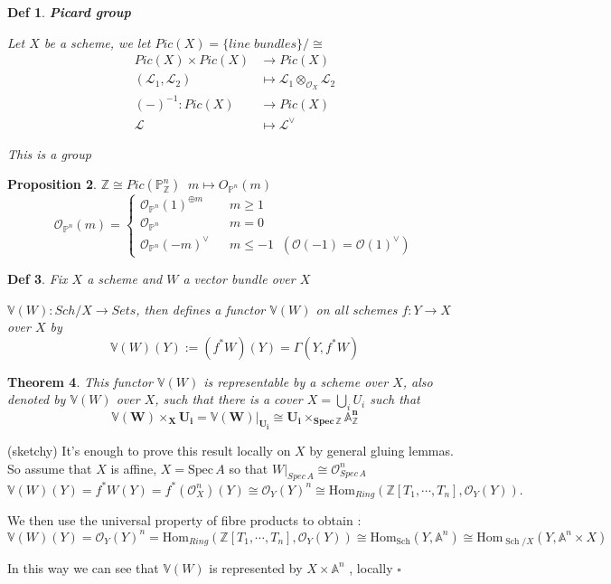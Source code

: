 \documentclass{article}
\newtheorem{theorem}{Theorem}[section]
\newtheorem{definition}[theorem]{Def}
\newtheorem{proposition}[theorem]{Proposition}
\newenvironment{Proof}{{\noindent \indent \it Proof:\quad}}{\hfill $\square$\par}
\begin{document}
\begin{definition}
    \textbf{Picard group}

    Let $X$ be a scheme, we let $Pic(X)=\{line\;bundles\}/\cong$
\begin{align*}
\label{sup}
Pic(X)\times Pic(X)&\to Pic(X)\\
(\mathcal L_1,\mathcal L_2)&\mapsto \mathcal L_1\otimes_{\mathcal O_X}\mathcal L_2\\
(-)^{-1}:Pic(X)&\to Pic(X)\\
\mathcal L&\mapsto \mathcal L^\vee
\end{align*}    

    This is a group
\end{definition}

\begin{proposition}
    $\mathbb Z\cong Pic(\mathbb P_{\mathbb Z}^n) \;\; m \mapsto O_{\mathbb P^n}(m)$
$$ 
\mathcal O_{\mathbb P^n}(m)=\left\{
\begin{array}{rcl}
\mathcal O_{\mathbb P^n}(1)^{\oplus m}       &      & m\geq 1\\
\mathcal O_{\mathbb P^n}     &      &  m=0\\
\mathcal O_{\mathbb P^n}(-m)^{\vee}  &  & m\leq -1\;\;(\mathcal O(-1)=\mathcal O(1)^\vee)
\end{array} \right.
$$
\end{proposition}

\begin{definition}
    Fix $X$ a scheme and $W$ a vector bundle over $X$

    $\mathbb V(W):Sch/X\to Sets$, then  defines a functor $\mathbb{V}(W)$ on all schemes $f:Y\to X$ over $X$ by
$$
\mathbb V(W)(Y):=(f^{\ast}{W})(Y)=\Gamma(Y,f^{\ast}{W})
$$
\end{definition}

\begin{theorem}
This functor $\mathbb V(W)$ is representable by a scheme over $X$, also denoted by $\mathbb V(W)$ over $X$, such that there is a cover
 $\textstyle X=\bigcup_{i}U_{i}$ such that
$$
\bm{\mathbb{V}({W})\times_{X}U_{i}=\mathbb{V}({W})|_{U_{i}}\cong U_{i}\times_{Spec\,\mathbb Z}\mathbb{A}_{\mathbb Z}^{n}}
$$
\end{theorem}
\begin{Proof}
    (sketchy)  It's enough to prove this result locally on $X$  by general gluing lemmas. So assume that $X$ is affine, $X={\mathrm{Spec}}\,A$ so that $W|_{Spec\, A}\cong\mathcal O_{Spec\,A}^n$
$$
\mathbb V({W})(Y)
=f^{\ast}{W}(Y)=f^{*}({\mathcal{O}}_{X}^n)(Y)
\cong{\mathcal{O}}_{Y}(Y)^n
\cong{\mathrm{Hom}}_{R i n g}(\mathbb{Z}[T_1,\cdots,T_n],{\mathcal{O}}_{Y}(Y)). 
$$

We then use the universal property of fibre products to obtain :
$$
\mathbb V({W})(Y)
=\mathcal O_{Y}(Y)^n
={\mathrm{Hom}}_{R i n g}(\mathbb{Z}[T_1,\cdots,T_n],\mathcal O_{Y}(Y))\cong{\mathrm{Hom}}_{\operatorname{Sch}}(Y,\mathbb{A}^{n})\cong{\mathrm{Hom}}_{\operatorname{Sch}/X}(Y,\mathbb{A}^{n}\times X)
$$

In this way we can see that $\mathbb V({W})$ is represented by $X\times\mathbb{A}^{n}$ , locally
\end{Proof}
\end{document}

